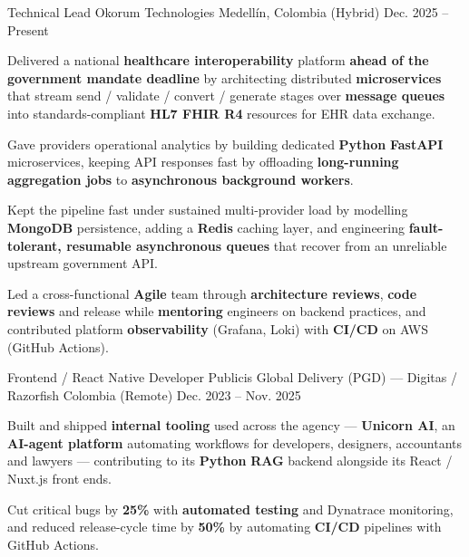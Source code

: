 \newcommand{\quotes}[1]{``#1''}

\begin{cventries}

  \cventry
  {Technical Lead}
  {Okorum Technologies}
  {Medellín, Colombia (Hybrid)}
  {Dec. 2025 -- Present}
  {
    \begin{cvitems}
      \item {Delivered a national \textbf{healthcare interoperability} platform \textbf{ahead of the government mandate deadline} by architecting distributed \textbf{microservices} that stream send / validate / convert / generate stages over \textbf{message queues} into standards-compliant \textbf{HL7 FHIR R4} resources for EHR data exchange.}
      \item {Gave providers operational analytics by building dedicated \textbf{Python} \textbf{FastAPI} microservices, keeping API responses fast by offloading \textbf{long-running aggregation jobs} to \textbf{asynchronous background workers}.}
      \item {Kept the pipeline fast under sustained multi-provider load by modelling \textbf{MongoDB} persistence, adding a \textbf{Redis} caching layer, and engineering \textbf{fault-tolerant, resumable asynchronous queues} that recover from an unreliable upstream government API.}
      \item {Led a cross-functional \textbf{Agile} team through \textbf{architecture reviews}, \textbf{code reviews} and release while \textbf{mentoring} engineers on backend practices, and contributed platform \textbf{observability} (Grafana, Loki) with \textbf{CI/CD} on AWS (GitHub Actions).}
    \end{cvitems}
  }

  \cventry
  {Frontend / React Native Developer}
  {Publicis Global Delivery (PGD) — Digitas / Razorfish}
  {Colombia (Remote)}
  {Dec. 2023 -- Nov. 2025}
  {
    \begin{cvitems}
      \item {Built and shipped \textbf{internal tooling} used across the agency --- \textbf{Unicorn AI}, an \textbf{AI-agent platform} automating workflows for developers, designers, accountants and lawyers --- contributing to its \textbf{Python} \textbf{RAG} backend alongside its React / Nuxt.js front ends.}
      \item {Cut critical bugs by \textbf{25\%} with \textbf{automated testing} and Dynatrace monitoring, and reduced release-cycle time by \textbf{50\%} by automating \textbf{CI/CD} pipelines with GitHub Actions.}
    \end{cvitems}
  }


\end{cventries}
